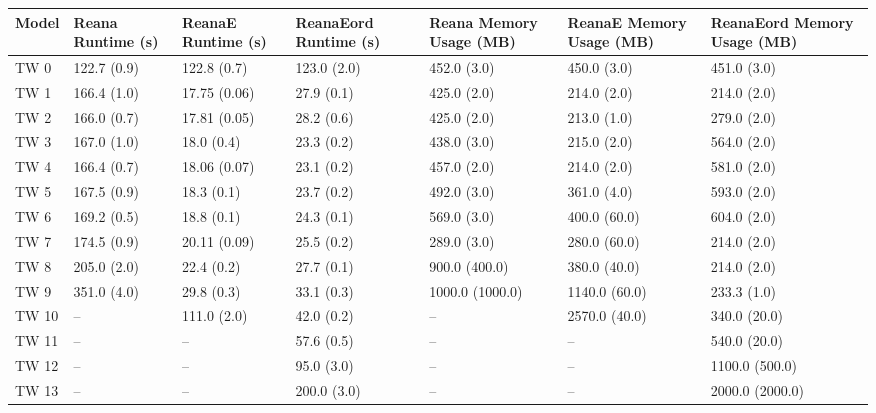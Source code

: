 \begin{tabular}{lllllll}
\toprule
Model & Reana Runtime (s) & ReanaE Runtime (s) & ReanaEord Runtime (s) & Reana Memory Usage (MB) & ReanaE Memory Usage (MB) & ReanaEord Memory Usage (MB) \\
\midrule
 TW 0 &       122.7 (0.9) &        122.8 (0.7) &           123.0 (2.0) &             452.0 (3.0) &              450.0 (3.0) &                 451.0 (3.0) \\
 TW 1 &       166.4 (1.0) &       17.75 (0.06) &            27.9 (0.1) &             425.0 (2.0) &              214.0 (2.0) &                 214.0 (2.0) \\
 TW 2 &       166.0 (0.7) &       17.81 (0.05) &            28.2 (0.6) &             425.0 (2.0) &              213.0 (1.0) &                 279.0 (2.0) \\
 TW 3 &       167.0 (1.0) &         18.0 (0.4) &            23.3 (0.2) &             438.0 (3.0) &              215.0 (2.0) &                 564.0 (2.0) \\
 TW 4 &       166.4 (0.7) &       18.06 (0.07) &            23.1 (0.2) &             457.0 (2.0) &              214.0 (2.0) &                 581.0 (2.0) \\
 TW 5 &       167.5 (0.9) &         18.3 (0.1) &            23.7 (0.2) &             492.0 (3.0) &              361.0 (4.0) &                 593.0 (2.0) \\
 TW 6 &       169.2 (0.5) &         18.8 (0.1) &            24.3 (0.1) &             569.0 (3.0) &             400.0 (60.0) &                 604.0 (2.0) \\
 TW 7 &       174.5 (0.9) &       20.11 (0.09) &            25.5 (0.2) &             289.0 (3.0) &             280.0 (60.0) &                 214.0 (2.0) \\
 TW 8 &       205.0 (2.0) &         22.4 (0.2) &            27.7 (0.1) &           900.0 (400.0) &             380.0 (40.0) &                 214.0 (2.0) \\
 TW 9 &       351.0 (4.0) &         29.8 (0.3) &            33.1 (0.3) &         1000.0 (1000.0) &            1140.0 (60.0) &                 233.3 (1.0) \\
TW 10 &                -- &        111.0 (2.0) &            42.0 (0.2) &                      -- &            2570.0 (40.0) &                340.0 (20.0) \\
TW 11 &                -- &                 -- &            57.6 (0.5) &                      -- &                       -- &                540.0 (20.0) \\
TW 12 &                -- &                 -- &            95.0 (3.0) &                      -- &                       -- &              1100.0 (500.0) \\
TW 13 &                -- &                 -- &           200.0 (3.0) &                      -- &                       -- &             2000.0 (2000.0) \\
\bottomrule
\end{tabular}
